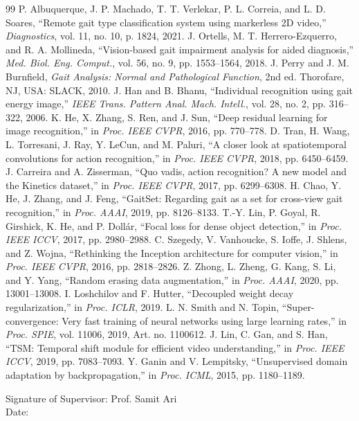 \documentclass[conference]{IEEEtran}
\begin{document}
\begin{thebibliography}{99}
 P. Albuquerque, J. P. Machado, T. T. Verlekar, P. L. Correia, and L. D. Soares, ``Remote gait type classification system using markerless 2D video,'' \emph{Diagnostics}, vol. 11, no. 10, p. 1824, 2021.
 J. Ortells, M. T. Herrero-Ezquerro, and R. A. Mollineda, ``Vision-based gait impairment analysis for aided diagnosis,'' \emph{Med. Biol. Eng. Comput.}, vol. 56, no. 9, pp. 1553--1564, 2018.
 J. Perry and J. M. Burnfield, \emph{Gait Analysis: Normal and Pathological Function}, 2nd ed. Thorofare, NJ, USA: SLACK, 2010.
 J. Han and B. Bhanu, ``Individual recognition using gait energy image,'' \emph{IEEE Trans. Pattern Anal. Mach. Intell.}, vol. 28, no. 2, pp. 316--322, 2006.
 K. He, X. Zhang, S. Ren, and J. Sun, ``Deep residual learning for image recognition,'' in \emph{Proc. IEEE CVPR}, 2016, pp. 770--778.
 D. Tran, H. Wang, L. Torresani, J. Ray, Y. LeCun, and M. Paluri, ``A closer look at spatiotemporal convolutions for action recognition,'' in \emph{Proc. IEEE CVPR}, 2018, pp. 6450--6459.
 J. Carreira and A. Zisserman, ``Quo vadis, action recognition? A new model and the Kinetics dataset,'' in \emph{Proc. IEEE CVPR}, 2017, pp. 6299--6308.
 H. Chao, Y. He, J. Zhang, and J. Feng, ``GaitSet: Regarding gait as a set for cross-view gait recognition,'' in \emph{Proc. AAAI}, 2019, pp. 8126--8133.
 T.-Y. Lin, P. Goyal, R. Girshick, K. He, and P. Doll\'ar, ``Focal loss for dense object detection,'' in \emph{Proc. IEEE ICCV}, 2017, pp. 2980--2988.
 C. Szegedy, V. Vanhoucke, S. Ioffe, J. Shlens, and Z. Wojna, ``Rethinking the Inception architecture for computer vision,'' in \emph{Proc. IEEE CVPR}, 2016, pp. 2818--2826.
 Z. Zhong, L. Zheng, G. Kang, S. Li, and Y. Yang, ``Random erasing data augmentation,'' in \emph{Proc. AAAI}, 2020, pp. 13001--13008.
 I. Loshchilov and F. Hutter, ``Decoupled weight decay regularization,'' in \emph{Proc. ICLR}, 2019.
 L. N. Smith and N. Topin, ``Super-convergence: Very fast training of neural networks using large learning rates,'' in \emph{Proc. SPIE}, vol. 11006, 2019, Art. no. 1100612.
 J. Lin, C. Gan, and S. Han, ``TSM: Temporal shift module for efficient video understanding,'' in \emph{Proc. IEEE ICCV}, 2019, pp. 7083--7093.
 Y. Ganin and V. Lempitsky, ``Unsupervised domain adaptation by backpropagation,'' in \emph{Proc. ICML}, 2015, pp. 1180--1189.
\end{thebibliography}

\vspace{6mm}
\noindent Signature of Supervisor: Prof. Samit Ari\\[2mm]
Date:
\end{document}
